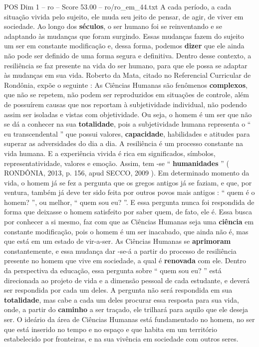\begin{textsample}{POS Dim 1 – ro – Score 53.00 – ro/ro\_em\_44.txt}
A cada período, a cada situação vivida pelo sujeito, ele muda seu jeito de pensar, de agir, de viver em sociedade.
Ao longo dos \textbf{séculos}, o ser humano foi se reinventando e se adaptando às mudanças que foram surgindo.
Essas mudanças fazem do sujeito um ser em constante modificação e, dessa forma, podemos \textbf{dizer} que ele ainda não pode ser definido de uma forma segura e definitiva.
Dentro desse contexto, a resiliência se faz presente na vida do ser humano, para que ele possa se adaptar às mudanças em sua vida.
Roberto da Mata, citado no Referencial Curricular de Rondônia, expõe o seguinte : As Ciências Humanas são fenômenos \textbf{complexos}, que não se repetem, não podem ser reproduzidos em situações de controle, além de possuírem causas que nos reportam à subjetividade individual, não podendo assim ser isoladas e vistas com objetividade.
Ou seja, o homem é um ser que não se dá a conhecer na sua \textbf{totalidade}, pois a subjetividade humana representa o “ eu transcendental ” que possui valores, \textbf{capacidade}, habilidades e atitudes para superar as adversidades do dia a dia.
A resiliência é um processo constante na vida humana.
E a experiência vivida é rica em significados, símbolos, representatividade, valores e emoção.
Assim, tem -se “ \textbf{humanidades} ” ( RONDÔNIA, 2013, p. 156, apud SECCO, 2009 ).
Em determinado momento da vida, o homem já se fez a pergunta que os gregos antigos já se faziam, e que, por ventura, também já deve ter sido feita por outros povos mais antigos : “ quem é o homem? ”, ou melhor, “ quem sou eu? ”.
E essa pergunta nunca foi respondida de forma que deixasse o homem satisfeito por saber quem, de fato, ele é.
Essa busca por conhecer a si mesmo, faz com que as Ciências Humanas seja uma \textbf{ciência} em constante modificação, pois o homem é um ser inacabado, que ainda não é, mas que está em um estado de vir-a-ser.
As Ciências Humanas se \textbf{aprimoram} constantemente, e essa mudança dar -se-á a partir do processo de resiliência presente no homem que vive em sociedade, a qual é \textbf{renovada} com ele.
Dentro da perspectiva da educação, essa pergunta sobre “ quem sou eu? ” está direcionada ao projeto de vida e a dimensão pessoal de cada estudante, e deverá ser respondida por cada um deles.
A pergunta não será respondida em sua \textbf{totalidade}, mas cabe a cada um deles procurar essa resposta para sua vida, onde, a partir do \textbf{caminho} a ser traçado, ele trilhará para aquilo que ele deseja ser.
O ideário da área de Ciências Humanas está fundamentado no homem, no ser que está inserido no tempo e no espaço e que habita em um território estabelecido por fronteiras, e na sua vivência em sociedade com outros seres.

\end{textsample}
